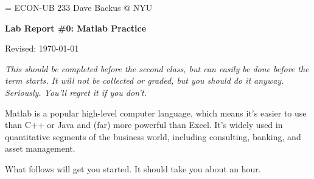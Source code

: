 \documentclass[11pt]{exam}
\begin{document}
\parskip=\bigskipamount
\parindent=0.0in
\thispagestyle{empty}
{\large ECON-UB 233 \hfill Dave Backus @ NYU}

\bigskip\bigskip
\centerline{\Large \bf Lab Report \#0:  Matlab Practice}
\centerline{Revised: \today}

\bigskip
{\it This should be completed before the second class, 
but can easily be done before the term starts.
It will not be collected or graded, but you should do it anyway.  
Seriously. You'll regret it if you don't.} 

Matlab is a popular high-level computer language,
which means it's easier to use than C++ or Java
and (far) more powerful than Excel.
It's widely used in quantitative segments of the business world,
including consulting, banking, and asset management.

What follows will get you started.  It should take you about an hour.
%
\end{document}
